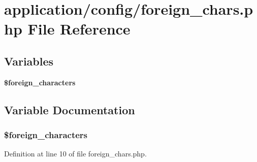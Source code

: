 \section{application/config/foreign\-\_\-chars.php File Reference}
\label{foreign__chars_8php}
\subsection*{Variables}
\begin{DoxyCompactItemize}
\item 
{\bf \$foreign\-\_\-characters}
\end{DoxyCompactItemize}


\subsection{Variable Documentation}
\subsubsection[{\$foreign\-\_\-characters}]{\setlength{\rightskip}{0pt plus 5cm}\$foreign\-\_\-characters}\label{foreign__chars_8php_a77bf091eac4b63b8efea27293e5ca79b}


Definition at line 10 of file foreign\-\_\-chars.\-php.

